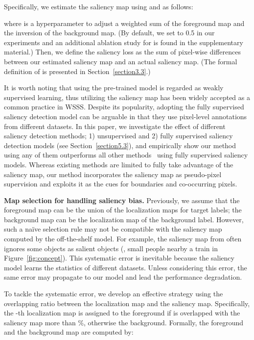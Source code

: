 \documentclass[final]{cvpr}
\begin{document}
Specifically, we estimate the saliency map  using  and  as follows:\vspace{-1mm}

\noindent where  is a hyperparameter to adjust a weighted sum of the foreground map and the inversion of the background map. (By default, we set  to 0.5 in our experiments and an additional ablation study for  is found in the supplementary material.) Then, we define the saliency loss  as the sum of pixel-wise differences between our estimated saliency map and an actual saliency map. (The formal definition of  is presented in Section~\ref{section3.3}.)

It is worth noting that using the pre-trained model is regarded as weakly supervised learning, thus utilizing the saliency map has been widely accepted as a common practice in WSSS. Despite its popularity, adopting the fully supervised saliency detection model can be arguable in that they use pixel-level annotations from different datasets. In this paper, we investigate the effect of different saliency detection methods; 1) unsupervised and 2) fully supervised saliency detection models (see Section~\ref{section5.3}), and empirically show our method using any of them outperforms all other methods~\cite{fan2020learning,jiang2019integral,wang2018weakly, wei2016stc,yao2020saliency} using fully supervised saliency models. Whereas existing methods are limited to fully take advantage of the saliency map, our method incorporates the saliency map as pseudo-pixel supervision and exploits it as the cues for boundaries and co-occurring pixels.

\vspace{1mm}
\noindent\textbf{Map selection for handling saliency bias.} Previously, we assume that the foreground map can be the union of the localization maps for target labels; the background map can be the localization map of the background label. However, such a na\"ive selection rule may not be compatible with the saliency map computed by the off-the-shelf model. For example, the saliency map from \cite{zhao2019pyramid} often ignores some objects as salient objects (\eg, small people nearby a train in Figure~\ref{fig:concept}). This systematic error is inevitable because the saliency model learns the statistics of different datasets. Unless considering this error, the same error may propagate to our model and lead the performance degradation. 


To tackle the systematic error, we develop an effective strategy using the overlapping ratio between the localization map and the saliency map. Specifically, the -th localization map  is assigned to the foreground if  is overlapped with the saliency map more than \%, otherwise the background. Formally, the foreground and the background map are computed by: \vspace{-1mm}
\end{document}
